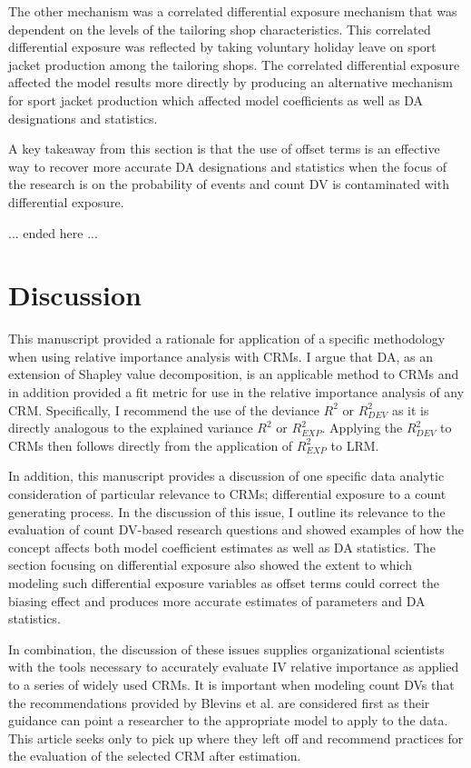 \documentclass[ShortAfour,times,sageapa]{sagej}
\begin{document}
	The other mechanism was a correlated differential exposure mechanism that was dependent on the levels of the tailoring shop characteristics.
	This correlated differential exposure was reflected by taking voluntary holiday leave on sport jacket production among the tailoring shops.
	The correlated differential exposure affected the model results more directly by producing an alternative mechanism for sport jacket production which affected model coefficients as well as DA designations and statistics.
	
	A key takeaway from this section is that the use of offset terms is an effective way to recover more accurate DA designations and statistics when the focus of the research is on the probability of events and count DV is contaminated with differential exposure.
	
	... ended here ...

	
\section{Discussion}

	This manuscript provided a rationale for application of a specific methodology when using relative importance analysis with CRMs.
	I argue that DA, as an extension of Shapley value decomposition, is an applicable method to CRMs and in addition provided a fit metric for use in the relative importance analysis of any CRM.
	Specifically, I recommend the use of the deviance $R^2$ or $R^2_{DEV}$ as it is directly analogous to the explained variance $R^2$ or $R^2_{EXP}$.
	Applying the $R^2_{DEV}$ to CRMs then follows directly from the application of $R^2_{EXP}$ to LRM.
	
	In addition, this manuscript provides a discussion of one specific data analytic consideration of particular relevance to CRMs; differential exposure to a count generating process.
	In the discussion of this issue, I outline its relevance to the evaluation of count DV-based research questions and showed examples of how the concept affects both model coefficient estimates as well as DA statistics.
	The section focusing on differential exposure also showed the extent to which modeling such differential exposure variables as offset terms could correct the biasing effect and produces more accurate estimates of parameters and DA statistics.
	
	In combination, the discussion of these issues supplies organizational scientists with the tools necessary to accurately evaluate IV relative importance as applied to a series of widely used CRMs. 
	It is important when modeling count DVs that the recommendations provided by Blevins et al. \citeyear{blevins2015count} are considered first as their guidance can point a researcher to the appropriate model to apply to the data. 
	This article seeks only to pick up where they left off and recommend practices for the evaluation of the selected CRM after estimation. 
	
\end{document}
